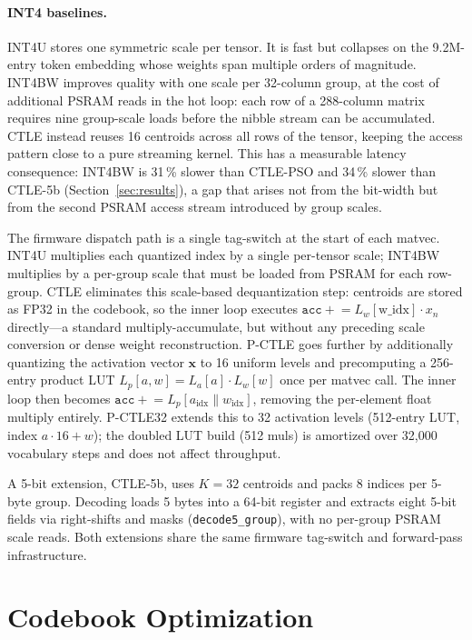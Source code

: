 \documentclass[10pt,journal]{IEEEtran}
\begin{document}
\paragraph{INT4 baselines.}
INT4U stores one symmetric scale per tensor. It is fast but collapses on the
9.2M-entry token embedding whose weights span multiple orders of magnitude.
INT4BW improves quality with one scale per 32-column group, at the cost of
additional PSRAM reads in the hot loop: each row of a 288-column matrix requires
nine group-scale loads before the nibble stream can be accumulated. CTLE instead
reuses 16 centroids across all rows of the tensor, keeping the access pattern
close to a pure streaming kernel. This has a measurable latency consequence:
INT4BW is 31\,\% slower than CTLE-PSO and 34\,\% slower than CTLE-5b
(Section~\ref{sec:results}), a gap that arises not from the bit-width but from
the second PSRAM access stream introduced by group scales.

The firmware dispatch path is a single tag-switch at the start of each matvec.
INT4U multiplies each quantized index by a single per-tensor scale;
INT4BW multiplies by a per-group scale that must be loaded from PSRAM for each
row-group. CTLE eliminates this scale-based dequantization step: centroids are
stored as FP32 in the codebook, so the inner loop executes
$\texttt{acc} \mathrel{+}= L_w[\text{w\_idx}] \cdot x_n$ directly---a
standard multiply-accumulate, but without any preceding scale conversion or
dense weight reconstruction.
P-CTLE goes further by additionally quantizing the activation vector $\mathbf{x}$
to 16 uniform levels and precomputing a 256-entry product LUT
$L_p[a,w]=L_a[a]\cdot L_w[w]$ once per matvec call. The inner loop then
becomes $\texttt{acc} \mathrel{+}= L_p[a_\text{idx} \| w_\text{idx}]$,
removing the per-element float multiply entirely.
P-CTLE32 extends this to 32 activation levels (512-entry LUT, index
$a{\cdot}16\!+\!w$); the doubled LUT build (512 muls) is amortized over
32{,}000 vocabulary steps and does not affect throughput.

A 5-bit extension, CTLE-5b, uses $K\!=\!32$ centroids and packs 8 indices
per 5-byte group. Decoding loads 5 bytes into a 64-bit register and extracts
eight 5-bit fields via right-shifts and masks (\texttt{decode5\_group}),
with no per-group PSRAM scale reads. Both extensions share the same firmware
tag-switch and forward-pass infrastructure.


\section{Codebook Optimization}
\end{document}
